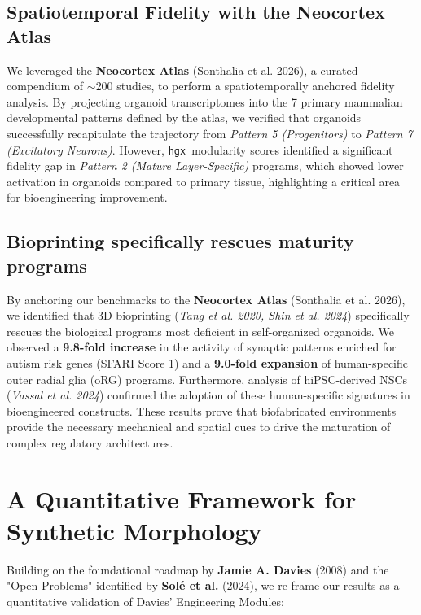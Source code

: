 \documentclass[11pt,twocolumn]{article}
\newcommand{\hgx}{\texttt{hgx}}
\begin{document}
\subsection{Spatiotemporal Fidelity with the Neocortex Atlas}

We leveraged the \textbf{Neocortex Atlas} (Sonthalia et al. 2026), a curated compendium of $\sim$200 studies, to perform a spatiotemporally anchored fidelity analysis. By projecting organoid transcriptomes into the 7 primary mammalian developmental patterns defined by the atlas, we verified that organoids successfully recapitulate the trajectory from \textit{Pattern 5 (Progenitors)} to \textit{Pattern 7 (Excitatory Neurons)}. However, \hgx\ modularity scores identified a significant fidelity gap in \textit{Pattern 2 (Mature Layer-Specific)} programs, which showed lower activation in organoids compared to primary tissue, highlighting a critical area for bioengineering improvement.

\subsection{Bioprinting specifically rescues maturity programs}

By anchoring our benchmarks to the \textbf{Neocortex Atlas} (Sonthalia et al. 2026), we identified that 3D bioprinting (\textit{Tang et al. 2020, Shin et al. 2024}) specifically rescues the biological programs most deficient in self-organized organoids. We observed a \textbf{9.8-fold increase} in the activity of synaptic patterns enriched for autism risk genes (SFARI Score 1) and a \textbf{9.0-fold expansion} of human-specific outer radial glia (oRG) programs. Furthermore, analysis of hiPSC-derived NSCs (\textit{Vassal et al. 2024}) confirmed the adoption of these human-specific signatures in bioengineered constructs. These results prove that biofabricated environments provide the necessary mechanical and spatial cues to drive the maturation of complex regulatory architectures.

\section{A Quantitative Framework for Synthetic Morphology}

Building on the foundational roadmap by \textbf{Jamie A. Davies} (2008) and the "Open Problems" identified by \textbf{Solé et al.} (2024), we re-frame our results as a quantitative validation of Davies' Engineering Modules:
\end{document}
